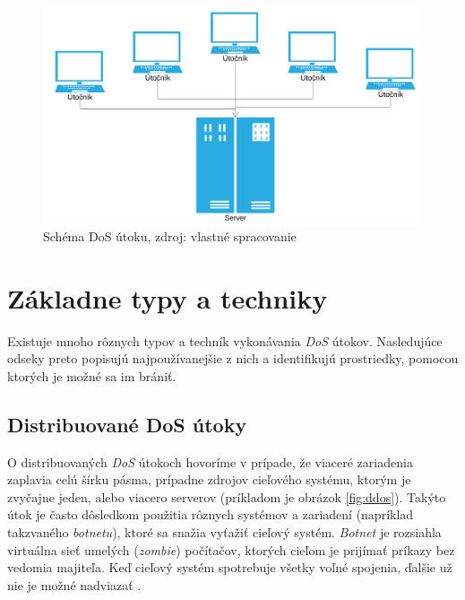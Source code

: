 \documentclass[
  printed, %
  table,   %
  lof,     %
  nolot,   %
  nocover
]{fithesis3}
\begin{document}
\begin{figure}[h]
  \centering
    \includegraphics[width=\textwidth]{images/dos.png}
  \caption{Schéma DoS útoku, zdroj: vlastné spracovanie}
  \label{fig:dos}
\end{figure}

\section{Základne typy a techniky}
Existuje mnoho rôznych typov a techník vykonávania \textit{DoS} útokov.
Nasledujúce odseky preto popisujú najpoužívanejšie z nich a identifikujú
prostriedky, pomocou ktorých je možné sa im brániť.

\subsection{Distribuované DoS útoky}
O distribuovaných \textit{DoS} útokoch hovoríme v prípade, že viaceré zariadenia zaplavia
celú šírku pásma, prípadne zdrojov cieľového systému, ktorým je zvyčajne jeden, alebo viacero
serverov (príkladom je obrázok \ref{fig:ddos}). Takýto útok je často dôsledkom použitia rôznych systémov a zariadení (napríklad
takzvaného \textit{botnetu}), ktoré sa snažia vyťažiť cieľový systém. \textit{Botnet} je rozsiahla
virtuálna sieť umelých (\textit{zombie}) počítačov, ktorých cieľom je prijímať príkazy bez
vedomia majiteľa. Keď cieľový systém spotrebuje všetky voľné spojenia, ďalšie už nie
je možné nadviazať \cite{Zargar:2013:DDoS}. 
\end{document}
